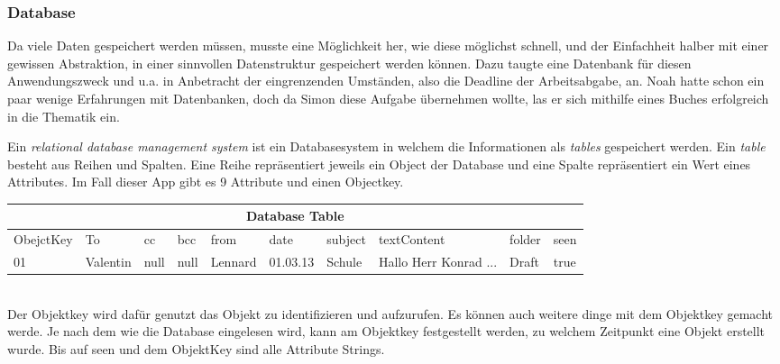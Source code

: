 \documentclass[a4paper,11pt]{article}
\begin{document}
\subsubsection{Database}


Da viele Daten gespeichert werden müssen, musste eine Möglichkeit her, wie diese möglichst schnell, und der Einfachheit halber mit einer gewissen Abstraktion, in einer sinnvollen Datenstruktur gespeichert werden können. Dazu taugte eine Datenbank für diesen Anwendungszweck und u.a. in Anbetracht der eingrenzenden Umständen, also die Deadline der Arbeitsabgabe, an. Noah hatte schon ein paar wenige Erfahrungen mit Datenbanken, doch da Simon diese Aufgabe übernehmen wollte, las er sich mithilfe eines Buches \cite{riccardi2001} erfolgreich in die Thematik ein.


Ein \textit{relational database management system} ist ein Databasesystem in welchem die Informationen als \textit{tables} gespeichert werden. 
Ein \textit{table} besteht aus Reihen und Spalten. Eine Reihe repräsentiert jeweils ein Object der Database und eine Spalte repräsentiert ein Wert eines Attributes. Im Fall dieser App
gibt es 9 Attribute und einen Objectkey. \\


\begin{tabular}{ |p{1.6cm}  |p{1.1cm} |p{1.1cm} |p{1.05cm} |p{1.15cm} |p{1.15cm} |p{1.25cm} |p{1.75cm} |p{1.25cm} |p{1.15cm}|}
 \hline
 \multicolumn{10}{|c|}{Database Table} \\
 \hline
    ObejctKey &To & cc & bcc & from & date & subject & textContent & folder & seen  \\
 \hline
     01    &Valentin& null & null & Lennard & 01.03.13 & Schule &  Hallo Herr Konrad ...& Draft & true \\
 \hline
\end{tabular} \\

Der Objektkey wird dafür genutzt das Objekt zu identifizieren und aufzurufen. Es können auch weitere dinge mit dem Objektkey gemacht werde. 
Je nach dem wie die Database eingelesen wird, kann am Objektkey festgestellt werden, zu welchem Zeitpunkt eine Objekt erstellt wurde. Bis auf seen und dem ObjektKey sind 
alle Attribute Strings. 
\end{document}
